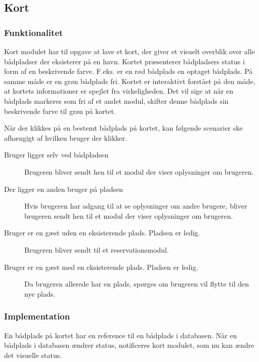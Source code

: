 \subsection{Kort}
\label{sub:kort}

\subsubsection{Funktionalitet}
\label{ssub:kort_funktionalitet}

Kort modulet har til opgave at lave et kort, der giver et visuelt overblik over alle bådpladser der eksisterer på en havn. Kortet præsenterer bådpladsers status i form af en beskrivende farve. F.eks. er en rød bådplads en optaget bådplads. På samme måde er en grøn bådplads fri. Kortet er interaktivt forstået på den måde, at kortets informationer er spejlet fra virkeligheden. Det vil sige at når en bådplads markeres som fri af et andet modul, skifter denne bådplads sin beskrivende farve til grøn på kortet.

Når der klikkes på en bestemt bådplads på kortet, kan følgende scenarier ske afhængigt af hvilken bruger der klikker.

\begin{description}
  \item[Bruger ligger selv ved bådpladsen] Brugeren bliver sendt hen til et modul der viser oplysninger om brugeren.
  \item[Der ligger en anden bruger på pladsen] Hvis brugeren har adgang til at se oplysninger om andre brugere, bliver brugeren sendt hen til et modul der viser oplysninger om brugeren.
  \item[Bruger er en gæst uden en eksisterende plads. Pladsen er ledig.] Brugeren bliver sendt til et reservationsmodul.
  \item[Bruger er en gæst med en eksisterende plads. Pladsen er ledig.] Da brugeren allerede har en plads, spørges om brugeren vil flytte til den nye plads.
\end{description}

\subsubsection{Implementation}
\label{ssub:kort_implementation}

En bådplads på kortet har en reference til en bådplads i databasen. Når en bådplads i databasen ændrer status, notificeres kort modulet, som nu kan ændre det visuelle status.

